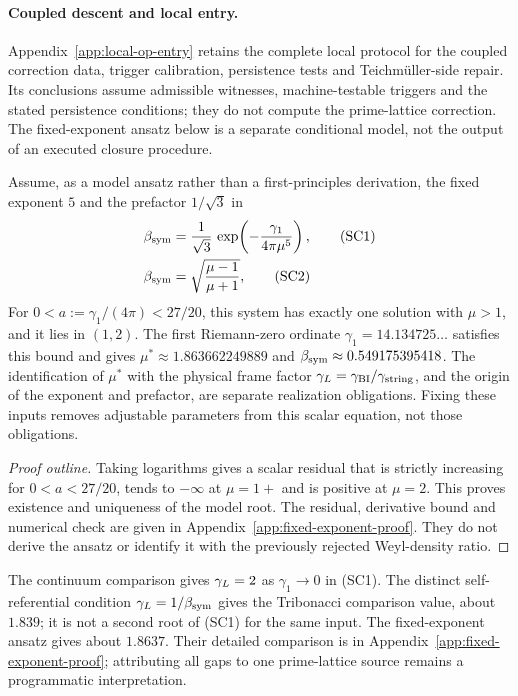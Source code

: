 \paragraph{Coupled descent and local entry.}
Appendix~\ref{app:local-op-entry} retains the complete local protocol
for the coupled correction data, trigger calibration, persistence
tests and Teichm\"uller-side repair. Its conclusions assume admissible
witnesses, machine-testable triggers and the stated persistence
conditions; they do not compute the prime-lattice correction.
The fixed-exponent ansatz below is a separate conditional model,
not the output of an executed closure procedure.

\begin{theorem}
\label{thm:self-consistent-gL}
Assume, as a model ansatz rather than a first-principles derivation,
the fixed exponent $5$ and the prefactor $1/\sqrt3$ in
\begin{align}
  \beta_{\mathrm{sym}} &= \frac{1}{\sqrt{3}}\,
    \exp\!\left(-\frac{\gamma_1}{4\pi\mu^5}\right),
  \tag{SC1}\label{eq:SC1}\\
  \beta_{\mathrm{sym}} &= \sqrt{\frac{\mu-1}{\mu+1}},
  \tag{SC2}\label{eq:SC2}
\end{align}
For $0<a:=\gamma_1/(4\pi)<27/20$, this system has exactly one
solution with $\mu>1$, and it lies in $(1,2)$. The first Riemann-zero
ordinate $\gamma_1=14.134725\ldots$ satisfies this bound and gives
$\mu^*\approx1.863662249889$ and $\beta_{\mathrm{sym}}\approx0.549175395418$.
The identification of $\mu^*$ with the physical frame factor
$\gamma_L=\gamma_{\mathrm{BI}}/\gamma_{\mathrm{string}}$, and the origin of the exponent and prefactor,
are separate realization obligations. Fixing these inputs removes
adjustable parameters from this scalar equation, not those obligations.
\end{theorem}

\begin{proof}[Proof outline]
Taking logarithms gives a scalar residual that is strictly increasing
for $0<a<27/20$, tends to $-\infty$ at $\mu=1+$ and is positive
at $\mu=2$. This proves existence and uniqueness of the model root.
The residual, derivative bound and numerical check are given in
Appendix~\ref{app:fixed-exponent-proof}. They do not derive the ansatz
or identify it with the previously rejected Weyl-density ratio.
\end{proof}

\begin{remark}
\label{rem:three-limits}
The continuum comparison gives $\gamma_L=2$ as $\gamma_1\to0$ in
(SC1). The distinct self-referential condition $\gamma_L=1/\beta_{\mathrm{sym}}$
gives the Tribonacci comparison value, about $1.839$; it is not a
second root of (SC1) for the same input. The fixed-exponent ansatz
gives about $1.8637$. Their detailed comparison is in
Appendix~\ref{app:fixed-exponent-proof}; attributing all gaps to one
prime-lattice source remains a programmatic interpretation.
\end{remark}

